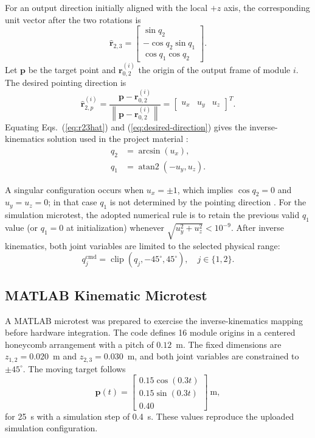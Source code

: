 \documentclass[lettersize,journal]{IEEEtran}
\begin{document}
For an output direction initially aligned with the local $+z$ axis, the corresponding unit vector after the two rotations is
\begin{equation}
\hat{\mathbf r}_{2,3}=
\begin{bmatrix}
\sin q_2\\
-\cos q_2\sin q_1\\
\cos q_1\cos q_2
\end{bmatrix}.
\label{eq:r23hat}
\end{equation}
Let $\mathbf p$ be the target point and $\mathbf r_{0,2}^{(i)}$ the origin of the output frame of module $i$. The desired pointing direction is
\begin{equation}
\hat{\mathbf r}_{2,p}^{(i)}=
\frac{\mathbf p-\mathbf r_{0,2}^{(i)}}{\left\|\mathbf p-\mathbf r_{0,2}^{(i)}\right\|}
=\begin{bmatrix}u_x & u_y & u_z\end{bmatrix}^{\!T}.
\label{eq:desired-direction}
\end{equation}
Equating Eqs.~(\ref{eq:r23hat}) and (\ref{eq:desired-direction}) gives the inverse-kinematics solution used in the project material \cite{lizarraga2026kinematics}:
\begin{align}
q_2 &= \arcsin(u_x), \label{eq:q2}\\
q_1 &= \operatorname{atan2}(-u_y,u_z). \label{eq:q1}
\end{align}

A singular configuration occurs when $u_x=\pm1$, which implies $\cos q_2=0$ and $u_y=u_z=0$; in that case $q_1$ is not determined by the pointing direction \cite{lizarraga2026kinematics}. For the simulation microtest, the adopted numerical rule is to retain the previous valid $q_1$ value (or $q_1=0$ at initialization) whenever $\sqrt{u_y^2+u_z^2}<10^{-9}$. After inverse kinematics, both joint variables are limited to the selected physical range:
\begin{equation}
q_j^{\mathrm{cmd}}=\operatorname{clip}\left(q_j,-45^{\circ},45^{\circ}\right),\quad j\in\{1,2\}.
\label{eq:clamp}
\end{equation}

\subsection{MATLAB Kinematic Microtest}
\label{sec:simulation}

A MATLAB microtest was prepared to exercise the inverse-kinematics mapping before hardware integration. The code defines 16 module origins in a centered honeycomb arrangement with a pitch of $0.12$~m. The fixed dimensions are $z_{1,2}=0.020$~m and $z_{2,3}=0.030$~m, and both joint variables are constrained to $\pm45^{\circ}$. The moving target follows
\begin{equation}
\mathbf p(t)=
\begin{bmatrix}
0.15\cos(0.3t)\\
0.15\sin(0.3t)\\
0.40
\end{bmatrix}\ \mathrm{m},
\label{eq:trajectory}
\end{equation}
for 25~s with a simulation step of 0.4~s. These values reproduce the uploaded simulation configuration.
\end{document}
